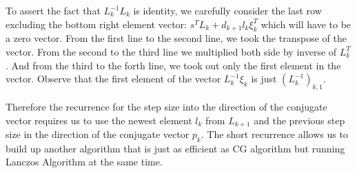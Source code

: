 \documentclass[]{article}
\theoremstyle{definition}
\begin{document}
            To assert the fact that $L_k^{-1}L_k$ is identity, we carefully consider the last row excluding the bottom right element vector: $s^TL_k + d_{k + 1}l_k\xi_k^T$ which will have to be a zero vector. From the first line to the second line, we took the transpose of the vector. From the second to the third line we multiplied both side by inverse of $L_k^{T}$. And from the third to the forth line, we took out only the first element in the vector. Observe that the first element of the vector $L_k^{-1}\xi_k$ is just $(L_k^{-1})_{k, 1}$. 
            \par
            Therefore the recurrence for the step size into the direction of the conjugate vector requires us to use the newest element $l_k$ from $L_{k + 1}$ and the previous step size in the direction of the conjugate vector $p_k$. The short recurrence allows us to build up another algorithm that is just as efficient as CG algorithm but running Lanczos Algorithm at the same time. 
\end{document}
